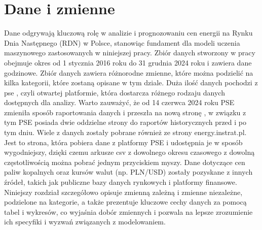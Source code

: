 \chapter{Dane i zmienne}
\label{ch:dane}

Dane odgrywają kluczową rolę w analizie i prognozowaniu cen energii na Rynku Dnia Następnego (RDN) w Polsce, stanowiąc fundament dla modeli uczenia maszynowego zastosowanych w niniejszej pracy. Zbiór danych stworzony w pracy obejmuje okres od 1 stycznia 2016 roku do 31 grudnia 2024 roku i zawiera dane godzinowe. Zbiór danych zawiera różnorodne zmienne, które można podzielić na kilka kategorii, które zostaną opisane w tym dziale. Duża ilość danych pochodzi z \gls{pse} \cite{PSEOLD}, czyli otwartej platformie, która dostarcza różnego rodzaju danych dostępnych dla analizy. Warto zauważyć, że od 14 czerwca 2024 roku PSE zmieniła sposób raportowania danych i przeszła na nową stronę \cite{PSENEW}, w związku z tym PSE posiada dwie oddzielne strony do raportów historycznych przed i po tym dniu. Wiele z danych zostały pobrane również ze strony energy.instrat.pl. Jest to strona, która pobiera dane z platformy PSE i udostępnia je w sposób wygodniejszy, dzięki czemu arkusze csv z dowolnego okresu czasowego z dowolną częstotliwością można pobrać jednym przyciskiem myszy. Dane dotyczące cen paliw kopalnych oraz kursów walut (np. PLN/USD) zostały pozyskane z innych źródeł, takich jak publiczne bazy danych rynkowych i platformy finansowe. Niniejszy rozdział szczegółowo opisuje zmienną zależną i zmienne niezależne, podzielone na kategorie, a także prezentuje kluczowe cechy danych za pomocą tabel i wykresów, co wyjaśnia dobór zmiennych i pozwala na lepsze zrozumienie ich specyfiki i wyzwań związanych z modelowaniem.

